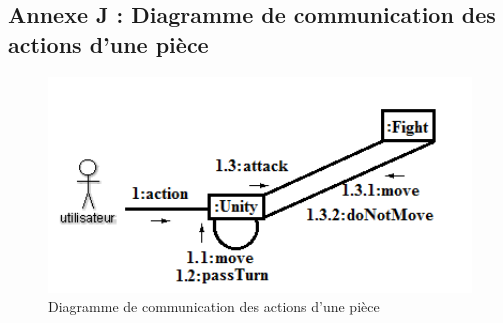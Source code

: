 \subsection{Annexe J : Diagramme de communication des actions d'une pièce}
\begin{figure}[!h]
\centering
\includegraphics[width=1\textwidth]{img/comm2.png}
\caption{Diagramme de communication des actions d'une pièce}
\end{figure}
\clearpage